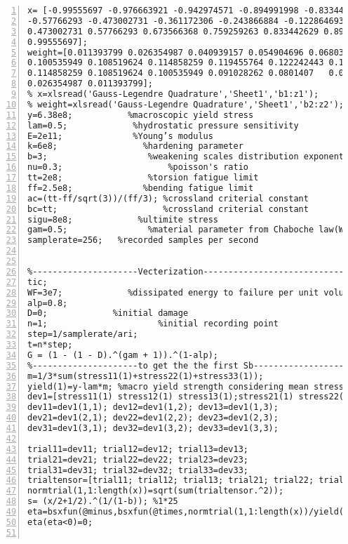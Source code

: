 \begin{lstlisting}[numbers=left, numberstyle=\tiny, keywordstyle=\color{blue!100}, commentstyle=\color{red!30!green!100!blue!100}, frame=shadowbox, rulesepcolor=\color{red!20!green!20!blue!20}]
x= [-0.99555697 -0.976663921 -0.942974571 -0.894991998 -0.833442629 -0.759259263 -0.673566368...
-0.57766293 -0.473002731 -0.361172306 -0.243866884 -0.122864693 0 0.122864693 0.243866884 0.361172306...
0.473002731 0.57766293 0.673566368 0.759259263 0.833442629 0.894991998 0.942974571 0.976663921...
0.99555697];
weight=[0.011393799	0.026354987	0.040939157	0.054904696	0.068038334	0.0801407	0.091028262...
0.100535949	0.108519624	0.114858259	0.119455764	0.122242443	0.123176054	0.122242443	0.119455764...
0.114858259	0.108519624	0.100535949	0.091028262	0.0801407	0.068038334	0.054904696	0.040939157...
0.026354987	0.011393799];
% x=xlsread('Gauss-Legendre Quadrature','Sheet1','b1:z1');
% weight=xlsread('Gauss-Legendre Quadrature','Sheet1','b2:z2');
y=6.38e8;           %macroscopic yield stress
lam=0.5;             %hydrostatic pressure sensitivity
E=2e11;              %Young’s modulus
k=6e8;                 %hardening parameter
b=3;                    %weakening scales distribution exponent
nu=0.3;                     %poisson's ratio
tt=2e8;                 %torsion fatigue limit
ff=2.5e8;              %bending fatigue limit
ac=(tt-ff/sqrt(3))/(ff/3); %crossland criterial constant
bc=tt;                     %crossland criterial constant
sigu=8e8;             %ultimite stress
gam=0.5;                %material parameter from Chaboche law(Wohler curve exponent)
samplerate=256;   %recorded samples per second


%---------------------Vecterization-----------------------------
tic;
WF=3e7;             %dissipated energy to failure per unit volume
alp=0.8;
D=0;             %initial damage
n=1;                      %initial recording point
step=1/samplerate/ari;
t=n*step;
G = (1 - (1 - D).^(gam + 1)).^(1-alp);
%---------------------to get the the first Sb-----------------------------
m=1/3*sum(stress11(1)+stress22(1)+stress33(1));
yield(1)=y-lam*m; %macro yield strength considering mean stress effect
dev1=[stress11(1) stress12(1) stress13(1);stress21(1) stress22(1) stress23(1);stress31(1) stress32(1) stress33(1)]-m*eye(3);
dev11=dev1(1,1); dev12=dev1(1,2); dev13=dev1(1,3);
dev21=dev1(2,1); dev22=dev1(2,2); dev23=dev1(2,3);
dev31=dev1(3,1); dev32=dev1(3,2); dev33=dev1(3,3);

trial11=dev11; trial12=dev12; trial13=dev13;
trial21=dev21; trial22=dev22; trial23=dev23;
trial31=dev31; trial32=dev32; trial33=dev33;
trialtensor=[trial11; trial12; trial13; trial21; trial22; trial23;trial31; trial32; trial33];
normtrial(1,1:length(x))=sqrt(sum(trialtensor.^2));
s= (x/2+1/2).^(1/(1-b)); %1*25
eta=bsxfun(@minus,bsxfun(@times,normtrial(1,1:length(x))/yield(1),s),1); %1*25
eta(eta<0)=0;


\end{lstlisting}

